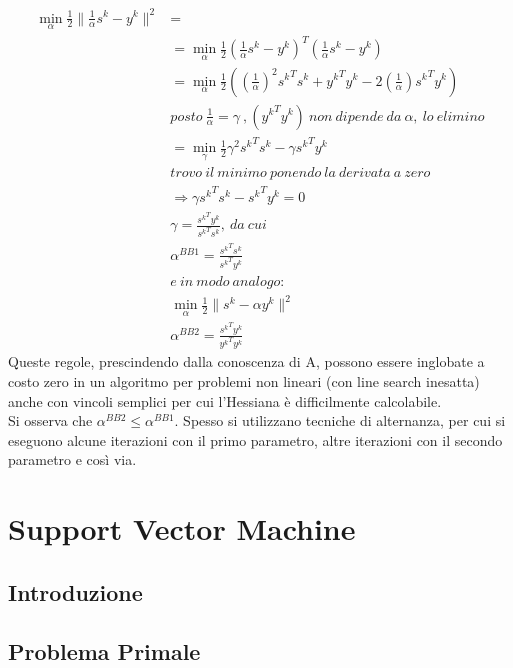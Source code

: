 \documentclass{report}
\begin{document}
\begin{equation} 
\label{BB6}
	\begin{split}
	\min_{\alpha} \frac{1}{2} \|\frac{1}{\alpha} s^k - y^k\|^2& =\\
	 &= \min_{\alpha} \frac{1}{2}\left (\frac{1}{\alpha} s^k - y^k\right)^T\left(\frac{1}{\alpha} s^k - y^k\right)\\
	 &= \min_{\alpha} \frac{1}{2} \left(\left(\frac{1}{\alpha}\right)^2 {s^k}^T s^k + {y^k}^T y^k-2\left(\frac{1}{\alpha}\right){s^k}^T y^k\right)\\
	 & posto\  \frac{1}{\alpha} = \gamma \ ,({y^k}^T y^k)\ non\ dipende\ da\ \alpha,\ lo\ elimino\\
	 &=  \min_{\gamma} \frac{1}{2} \gamma^2 {s^k}^T s^k -\gamma{s^k}^T y^k\\
	 &trovo\ il\ minimo\ ponendo\ la\ derivata\ a\ zero\\
	 &\Rightarrow \gamma {s^k}^T s^k -{s^k}^T y^k = 0\\
	 & \gamma = \frac{{s^k}^T y^k}{{s^k}^T s^k}, \ da\ cui\\
	 & \alpha^{BB1} = \frac{{s^k}^T s^k}{{s^k}^T y^k}\\
	 & e\ in\ modo\ analogo: \\
	 & \min_{\alpha} \frac{1}{2} \|s^k - \alpha y^k\|^2 \\
	 & \alpha^{BB2} = \frac{{s^k}^T y^k}{{y^k}^T y^k}
	\end{split}
\end{equation}
Queste regole, prescindendo dalla conoscenza di A, possono essere inglobate a costo zero in un algoritmo per problemi non lineari (con line search inesatta) anche con vincoli semplici per cui l'Hessiana è difficilmente calcolabile.\\
Si osserva che $\alpha^{BB2} \leqslant \alpha^{BB1}$. Spesso si utilizzano tecniche di alternanza, per cui si eseguono alcune iterazioni con il primo parametro, altre iterazioni con il secondo parametro e così via.

\chapter{Support Vector Machine}

\section{Introduzione}



\section{Problema Primale}
\end{document}
